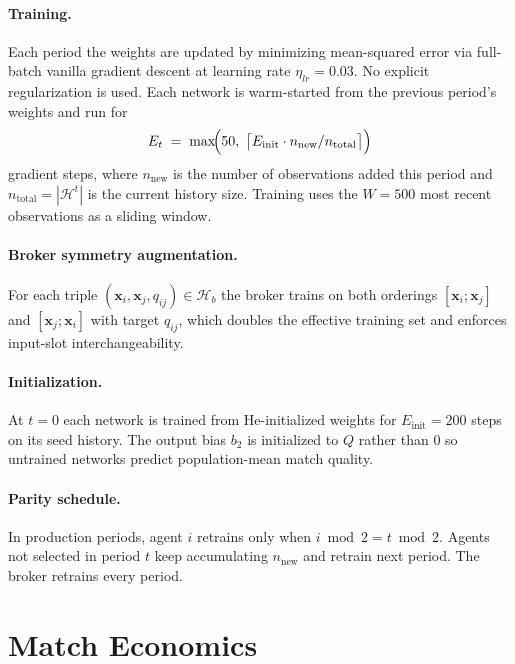 \documentclass[11pt]{article}
\newcommand{\x}{\mathbf{x}}
\newcommand{\Hist}{\mathcal{H}}
\begin{document}
\paragraph{Training.} Each period the weights are updated by minimizing mean-squared error via full-batch vanilla gradient descent at learning rate $\eta_{lr}=0.03$. No explicit regularization is used. Each network is warm-started from the previous period's weights and run for
\begin{equation}
E_t \;=\; \max\!\Bigl(50,\; \bigl\lceil E_{\text{init}}\cdot n_{\text{new}}/n_{\text{total}}\bigr\rceil\Bigr)
\label{eq:adaptive-steps}
\end{equation}
gradient steps, where $n_{\text{new}}$ is the number of observations added this period and $n_{\text{total}}=|\Hist^t|$ is the current history size. Training uses the $W=500$ most recent observations as a sliding window.

\paragraph{Broker symmetry augmentation.} For each triple $(\x_i,\x_j,q_{ij})\in\Hist_b$ the broker trains on both orderings $[\x_i;\x_j]$ and $[\x_j;\x_i]$ with target $q_{ij}$, which doubles the effective training set and enforces input-slot interchangeability.

\paragraph{Initialization.} At $t=0$ each network is trained from He-initialized weights for $E_{\text{init}}=200$ steps on its seed history. The output bias $b_2$ is initialized to $Q$ rather than $0$ so untrained networks predict population-mean match quality.

\paragraph{Parity schedule.} In production periods, agent $i$ retrains only when $i\bmod 2 = t\bmod 2$. Agents not selected in period $t$ keep accumulating $n_{\text{new}}$ and retrain next period. The broker retrains every period.

\section{Match Economics}\label{sec:economics}
\end{document}
